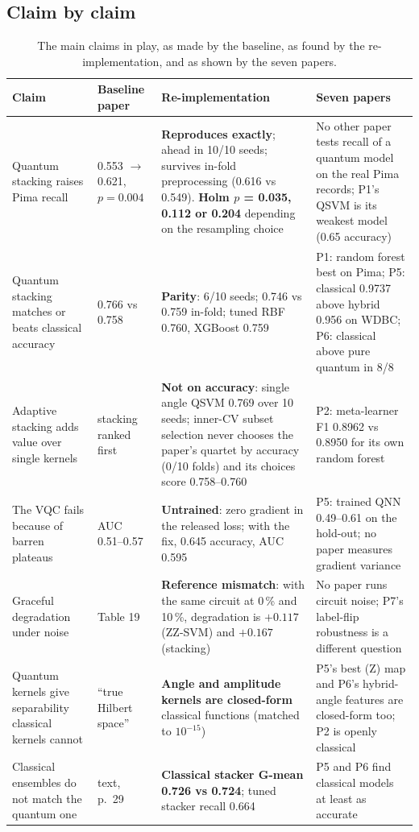 \documentclass[11pt,a4paper]{article}
\newcommand{\OK}[1]{\textcolor{ok}{\textbf{#1}}}
\newcommand{\WARN}[1]{\textcolor{warn}{\textbf{#1}}}
\newcommand{\BAD}[1]{\textcolor{bad}{\textbf{#1}}}
\begin{document}
\subsection{Claim by claim}
\begin{table}[H]
\centering\scriptsize
\caption{The main claims in play, as made by the baseline, as found by the re-implementation, and as shown by the seven papers.}
\label{tab:claims}
\begin{tabularx}{\textwidth}{L{2.6cm} L{3.2cm} Y L{4.0cm}}
\toprule
Claim & Baseline paper & Re-implementation & Seven papers \\
\midrule
Quantum stacking raises Pima recall & 0.553 $\to$ 0.621, $p=0.004$ & \OK{Reproduces exactly}; ahead in 10/10 seeds; survives in-fold preprocessing (0.616 vs 0.549). \WARN{Holm $p$ = 0.035, 0.112 or 0.204} depending on the resampling choice & No other paper tests recall of a quantum model on the real Pima records; P1's QSVM is its weakest model (0.65 accuracy) \\
Quantum stacking matches or beats classical accuracy & 0.766 vs 0.758 & \WARN{Parity}: 6/10 seeds; 0.746 vs 0.759 in-fold; tuned RBF 0.760, XGBoost 0.759 & P1: random forest best on Pima; P5: classical 0.9737 above hybrid 0.956 on WDBC; P6: classical above pure quantum in 8/8 \\
Adaptive stacking adds value over single kernels & stacking ranked first & \WARN{Not on accuracy}: single angle QSVM 0.769 over 10 seeds; inner-CV subset selection never chooses the paper's quartet by accuracy (0/10 folds) and its choices score 0.758--0.760 & P2: meta-learner F1 0.8962 vs 0.8950 for its own random forest \\
The VQC fails because of barren plateaus & AUC 0.51--0.57 & \BAD{Untrained}: zero gradient in the released loss; with the fix, 0.645 accuracy, AUC 0.595 & P5: trained QNN 0.49--0.61 on the hold-out; no paper measures gradient variance \\
Graceful degradation under noise & Table 19 & \BAD{Reference mismatch}: with the same circuit at 0\,\% and 10\,\%, degradation is $+0.117$ (ZZ-SVM) and $+0.167$ (stacking) & No paper runs circuit noise; P7's label-flip robustness is a different question \\
Quantum kernels give separability classical kernels cannot & ``true Hilbert space'' & \WARN{Angle and amplitude kernels are closed-form} classical functions (matched to $10^{-15}$) & P5's best (Z) map and P6's hybrid-angle features are closed-form too; P2 is openly classical \\
Classical ensembles do not match the quantum one & text, p.~29 & \WARN{Classical stacker G-mean 0.726 vs 0.724}; tuned stacker recall 0.664 & P5 and P6 find classical models at least as accurate \\
\bottomrule
\end{tabularx}
\end{table}
\end{document}
